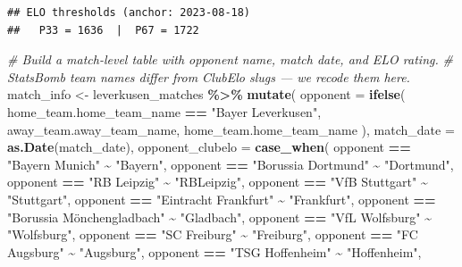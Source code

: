\documentclass[
]{article}
\newenvironment{Shaded}{\begin{snugshade}}{\end{snugshade}}
\newcommand{\AttributeTok}[1]{\textcolor[rgb]{0.13,0.29,0.53}{#1}}
\newcommand{\CommentTok}[1]{\textcolor[rgb]{0.56,0.35,0.01}{\textit{#1}}}
\newcommand{\FunctionTok}[1]{\textcolor[rgb]{0.13,0.29,0.53}{\textbf{#1}}}
\newcommand{\NormalTok}[1]{#1}
\newcommand{\OtherTok}[1]{\textcolor[rgb]{0.56,0.35,0.01}{#1}}
\newcommand{\SpecialCharTok}[1]{\textcolor[rgb]{0.81,0.36,0.00}{\textbf{#1}}}
\newcommand{\StringTok}[1]{\textcolor[rgb]{0.31,0.60,0.02}{#1}}
\begin{document}
\begin{verbatim}
## ELO thresholds (anchor: 2023-08-18)
##   P33 = 1636  |  P67 = 1722
\end{verbatim}

\begin{Shaded}
\begin{Highlighting}[]
\CommentTok{\# Build a match{-}level table with opponent name, match date, and ELO rating.}
\CommentTok{\# StatsBomb team names differ from ClubElo slugs — we recode them here.}
\NormalTok{match\_info }\OtherTok{\textless{}{-}}\NormalTok{ leverkusen\_matches }\SpecialCharTok{\%\textgreater{}\%}
  \FunctionTok{mutate}\NormalTok{(}
    \AttributeTok{opponent =} \FunctionTok{ifelse}\NormalTok{(}
\NormalTok{      home\_team.home\_team\_name }\SpecialCharTok{==} \StringTok{"Bayer Leverkusen"}\NormalTok{,}
\NormalTok{      away\_team.away\_team\_name,}
\NormalTok{      home\_team.home\_team\_name}
\NormalTok{    ),}
    \AttributeTok{match\_date =} \FunctionTok{as.Date}\NormalTok{(match\_date),}
    \AttributeTok{opponent\_clubelo =} \FunctionTok{case\_when}\NormalTok{(}
\NormalTok{      opponent }\SpecialCharTok{==} \StringTok{"Bayern Munich"}             \SpecialCharTok{\textasciitilde{}} \StringTok{"Bayern"}\NormalTok{,}
\NormalTok{      opponent }\SpecialCharTok{==} \StringTok{"Borussia Dortmund"}         \SpecialCharTok{\textasciitilde{}} \StringTok{"Dortmund"}\NormalTok{,}
\NormalTok{      opponent }\SpecialCharTok{==} \StringTok{"RB Leipzig"}                \SpecialCharTok{\textasciitilde{}} \StringTok{"RBLeipzig"}\NormalTok{,}
\NormalTok{      opponent }\SpecialCharTok{==} \StringTok{"VfB Stuttgart"}             \SpecialCharTok{\textasciitilde{}} \StringTok{"Stuttgart"}\NormalTok{,}
\NormalTok{      opponent }\SpecialCharTok{==} \StringTok{"Eintracht Frankfurt"}       \SpecialCharTok{\textasciitilde{}} \StringTok{"Frankfurt"}\NormalTok{,}
\NormalTok{      opponent }\SpecialCharTok{==} \StringTok{"Borussia Mönchengladbach"}  \SpecialCharTok{\textasciitilde{}} \StringTok{"Gladbach"}\NormalTok{,}
\NormalTok{      opponent }\SpecialCharTok{==} \StringTok{"VfL Wolfsburg"}             \SpecialCharTok{\textasciitilde{}} \StringTok{"Wolfsburg"}\NormalTok{,}
\NormalTok{      opponent }\SpecialCharTok{==} \StringTok{"SC Freiburg"}               \SpecialCharTok{\textasciitilde{}} \StringTok{"Freiburg"}\NormalTok{,}
\NormalTok{      opponent }\SpecialCharTok{==} \StringTok{"FC Augsburg"}               \SpecialCharTok{\textasciitilde{}} \StringTok{"Augsburg"}\NormalTok{,}
\NormalTok{      opponent }\SpecialCharTok{==} \StringTok{"TSG Hoffenheim"}            \SpecialCharTok{\textasciitilde{}} \StringTok{"Hoffenheim"}\NormalTok{,}

\end{Highlighting}
\end{Shaded}
\end{document}
